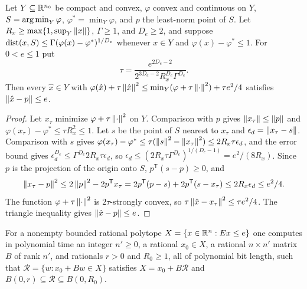 \begin{lemma}
\label{lem:recourse-selection}
Let $Y\subseteq\mathbb R^{n_0}$ be compact and convex, $\varphi$ convex and
continuous on $Y$, $S=\operatorname*{arg\,min}_Y\varphi$, $\varphi^*=\min_Y\varphi$, and $p$
the least-norm point of $S$. Let $R_x\ge\max\{1,\sup_Y\left\lVert x\right\rVert\}$,
$\Gamma\ge1$, and $D_e\ge2$, and suppose
$\operatorname{dist}(x,S)\le\Gamma(\varphi(x)-\varphi^*)^{1/D_e}$ whenever $x\in Y$ and
$\varphi(x)-\varphi^*\le1$. For $0<e\le1$ put
\[
 \tau=\frac{e^{2D_e-2}}{2^{3D_e-2}R_x^{D_e}\Gamma^{D_e}} .
\]
Then every $\hat x\in Y$ with
$\varphi(\hat x)+\tau\left\lVert\hat x\right\rVert^2\le\min_Y(\varphi+\tau\left\lVert\cdot\right\rVert^2)+\tau e^2/4$
satisfies $\left\lVert\hat x-p\right\rVert\le e$.
\end{lemma}

\begin{proof}
Let $x_\tau$ minimize $\varphi+\tau\left\lVert\cdot\right\rVert^2$ on $Y$. Comparison with
$p$ gives $\left\lVert x_\tau\right\rVert\le\left\lVert p\right\rVert$ and
$\varphi(x_\tau)-\varphi^*\le\tau R_x^2\le1$. Let $s$ be the point of $S$
nearest to $x_\tau$ and $\epsilon_d=\left\lVert x_\tau-s\right\rVert$. Comparison with $s$
gives $\varphi(x_\tau)-\varphi^*\le\tau(\left\lVert s\right\rVert^2-\left\lVert x_\tau\right\rVert^2)\le
2R_x\tau\epsilon_d$, and the error bound gives
$\epsilon_d^{D_e}\le\Gamma^{D_e}2R_x\tau\epsilon_d$, so
$\epsilon_d\le(2R_x\tau\Gamma^{D_e})^{1/(D_e-1)}=e^2/(8R_x)$. Since $p$
is the projection of the origin onto $S$, $p^{\mathsf T}(s-p)\ge0$, and
\[
 \left\lVert x_\tau-p\right\rVert^2\le2\left\lVert p\right\rVert^2-2p^{\mathsf T}x_\tau
 =2p^{\mathsf T}(p-s)+2p^{\mathsf T}(s-x_\tau)\le2R_x\epsilon_d\le e^2/4 .
\]
The function $\varphi+\tau\left\lVert\cdot\right\rVert^2$ is $2\tau$-strongly convex, so
$\tau\left\lVert\hat x-x_\tau\right\rVert^2\le\tau e^2/4$. The triangle inequality gives
$\left\lVert\hat x-p\right\rVert\le e$.
\end{proof}

\begin{lemma}
\label{lem:recourse-relative}
For a nonempty bounded rational polytope $X=\{x\in\mathbb R^n:Ex\le e\}$ one
computes in polynomial time an integer $n'\ge0$, a rational $x_0\in X$,
a rational $n\times n'$ matrix $B$ of rank $n'$, and rationals $r>0$ and
$R_0\ge1$, all of polynomial bit length, such that
$\mathcal R=\{w:x_0+Bw\in X\}$ satisfies $X=x_0+B\mathcal R$ and
$B(0,r)\subseteq\mathcal R\subseteq B(0,R_0)$.
\end{lemma}

